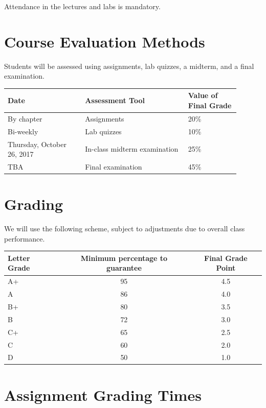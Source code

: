 \documentclass[12pt]{article}
\begin{document}
Attendance in the lectures and labs is mandatory.

\section{Course Evaluation Methods}

Students will be assessed using assignments, lab quizzes, a midterm, and a final examination.

\begin{center}
\begin{tabular}[t]{p{0.3\linewidth}p{0.4\linewidth}p{0.2\linewidth}}
\toprule
\mbox{}\newline \textbf{Date} &	\mbox{}\newline\textbf{Assessment Tool}	& \textbf{Value of \newline Final Grade} \\
\midrule
By chapter & Assignments & 20\% \\
Bi-weekly & Lab quizzes & 10\% \\
Thursday, October 26, 2017 & In-class midterm examination & 25\% \\
TBA & Final examination & 45\% \\
\bottomrule
\end{tabular}
\end{center}

\section{Grading}

We will use the following scheme, subject to adjustments due to overall class performance.

\begin{center}
\begin{tabular}[t]{lcc}
\toprule
Letter Grade & Minimum percentage to guarantee & Final Grade Point  \\
\midrule
A+ & 95 & 4.5 \\
A & 86 & 4.0 \\
B+ & 80 & 3.5 \\
B & 72 &  3.0 \\
C+ & 65  & 2.5 \\
C & 60 & 2.0 \\
D & 50 & 1.0  \\
\bottomrule
\end{tabular}
\end{center}

\section{Assignment Grading Times}
\end{document}
